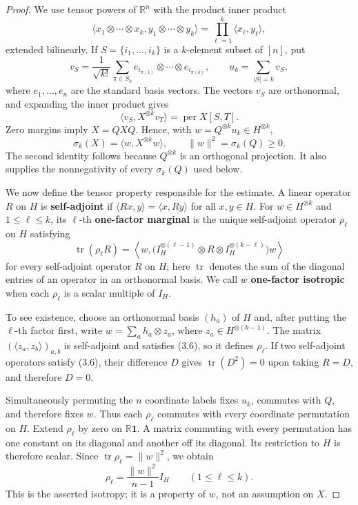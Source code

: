\documentclass[11pt]{article}
\begin{document}
\begin{proof}
We use tensor powers of $\mathbb R^n$ with the product inner
product
\[
\langle x_1\otimes\cdots\otimes x_k,
y_1\otimes\cdots\otimes y_k\rangle
=\prod_{\ell=1}^k\langle x_\ell,y_\ell\rangle,
\]
extended bilinearly. If $S=\{i_1,\ldots,i_k\}$ is a $k$-element subset of
$[n]$, put
\[
v_S=\frac1{\sqrt{k!}}\sum_{\pi\in S_k}
e_{i_{\pi(1)}}\otimes\cdots\otimes e_{i_{\pi(k)}},
\qquad
u_k=\sum_{|S|=k}v_S,
\tag{3.3}
\]
where $e_1,\ldots,e_n$ are the standard basis vectors. The vectors $v_S$
are orthonormal, and expanding the inner product gives
\[
\langle v_S,X^{\otimes k}v_T\rangle=\operatorname{per}X[S,T].
\tag{3.4}
\]
Zero margins imply $X=QXQ$. Hence, with
$w=Q^{\otimes k}u_k\in H^{\otimes k}$,
\[
\sigma_k(X)=\langle w,X^{\otimes k}w\rangle,
\qquad
\|w\|^2=\sigma_k(Q)\ge0.
\tag{3.5}
\]
The second identity follows because $Q^{\otimes k}$ is an orthogonal
projection. It also supplies the nonnegativity of every $\sigma_k(Q)$ used
below.

We now define the tensor property responsible for the estimate. A linear
operator $R$ on $H$ is \textbf{self-adjoint} if
$\langle Rx,y\rangle=\langle x,Ry\rangle$ for all $x,y\in H$. For
$w\in H^{\otimes k}$ and $1\le\ell\le k$, its $\ell$-th \textbf{one-factor
marginal} is the unique self-adjoint operator $\rho_\ell$ on $H$ satisfying
\[
\operatorname{tr}(\rho_\ell R)=
\left\langle w,
\bigl(I_H^{\otimes(\ell-1)}\otimes R\otimes
I_H^{\otimes(k-\ell)}\bigr)w\right\rangle
\tag{3.6}
\]
for every self-adjoint operator $R$ on $H$; here $\operatorname{tr}$ denotes
the sum of the diagonal entries of an operator in an orthonormal basis. We
call $w$ \textbf{one-factor isotropic} when each $\rho_\ell$ is a scalar multiple
of $I_H$.

To see existence, choose an orthonormal basis $(h_a)$ of $H$ and, after putting
the $\ell$-th factor first, write $w=\sum_a h_a\otimes z_a$, where
$z_a\in H^{\otimes(k-1)}$. The matrix
$(\langle z_a,z_b\rangle)_{a,b}$ is self-adjoint and satisfies (3.6), so it
defines $\rho_\ell$. If two self-adjoint operators satisfy (3.6), their
difference $D$ gives $\operatorname{tr}(D^2)=0$ upon taking $R=D$, and therefore
$D=0$.

Simultaneously permuting the $n$ coordinate labels fixes $u_k$, commutes with
$Q$, and therefore fixes $w$. Thus each $\rho_\ell$ commutes with every
coordinate permutation on $H$. Extend $\rho_\ell$ by zero on
$\mathbb R\mathbf1$. A matrix commuting with every permutation has one
constant on its diagonal and another off its diagonal. Its restriction to
$H$ is therefore scalar. Since
$\operatorname{tr}\rho_\ell=\|w\|^2$, we obtain
\[
\rho_\ell=\frac{\|w\|^2}{n-1}I_H
\qquad(1\le\ell\le k).
\tag{3.7}
\]
This is the asserted isotropy; it is a property of $w$, not an assumption on
$X$.


\end{proof}
\end{document}
